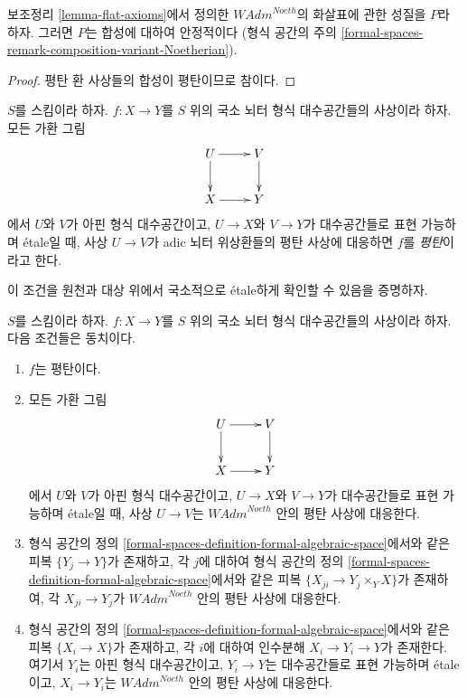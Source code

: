 \begin{lemma}
\label{lemma-composition-flat-continuous}
보조정리 \ref{lemma-flat-axioms}에서 정의한
$\textit{WAdm}^{Noeth}$의 화살표에 관한 성질을 $P$라 하자.
그러면 $P$는 합성에 대하여 안정적이다
(형식 공간의 주의 \ref{formal-spaces-remark-composition-variant-Noetherian}).
\end{lemma}

\begin{proof}
평탄 환 사상들의 합성이 평탄이므로 참이다.
\end{proof}

\begin{definition}
\label{definition-flat}
$S$를 스킴이라 하자. $f : X \to Y$를 $S$ 위의
국소 뇌터 형식 대수공간들의 사상이라 하자. 모든 가환 그림
$$
\xymatrix{
U \ar[d] \ar[r] & V \ar[d] \\
X \ar[r] & Y
}
$$
에서 $U$와 $V$가 아핀 형식 대수공간이고, $U \to X$와 $V \to Y$가
대수공간들로 표현 가능하며 \'etale일 때, 사상 $U \to V$가
adic 뇌터 위상환들의 평탄 사상에 대응하면 $f$를 {\it 평탄}이라고 한다.
\end{definition}

\noindent
이 조건을 원천과 대상 위에서 국소적으로 \'etale하게 확인할 수 있음을 증명하자.

\begin{lemma}
\label{lemma-flat-morphisms}
$S$를 스킴이라 하자. $f : X \to Y$를 $S$ 위의
국소 뇌터 형식 대수공간들의 사상이라 하자. 다음 조건들은 동치이다.
\begin{enumerate}
\item $f$는 평탄이다.
\item 모든 가환 그림
$$
\xymatrix{
U \ar[d] \ar[r] & V \ar[d] \\
X \ar[r] & Y
}
$$
에서 $U$와 $V$가 아핀 형식 대수공간이고, $U \to X$와 $V \to Y$가
대수공간들로 표현 가능하며 \'etale일 때, 사상 $U \to V$는
$\textit{WAdm}^{Noeth}$ 안의 평탄 사상에 대응한다.
\item 형식 공간의 정의
\ref{formal-spaces-definition-formal-algebraic-space}에서와 같은 피복
$\{Y_j \to Y\}$가 존재하고, 각 $j$에 대하여 형식 공간의 정의
\ref{formal-spaces-definition-formal-algebraic-space}에서와 같은 피복
$\{X_{ji} \to Y_j \times_Y X\}$가 존재하여, 각 $X_{ji} \to Y_j$가
$\textit{WAdm}^{Noeth}$ 안의 평탄 사상에 대응한다.
\item 형식 공간의 정의
\ref{formal-spaces-definition-formal-algebraic-space}에서와 같은 피복
$\{X_i \to X\}$가 존재하고, 각 $i$에 대하여 인수분해
$X_i \to Y_i \to Y$가 존재한다. 여기서 $Y_i$는 아핀 형식 대수공간이고,
$Y_i \to Y$는 대수공간들로 표현 가능하며 \'etale이고,
$X_i \to Y_i$는 $\textit{WAdm}^{Noeth}$ 안의 평탄 사상에 대응한다.
\end{enumerate}
\end{lemma}


